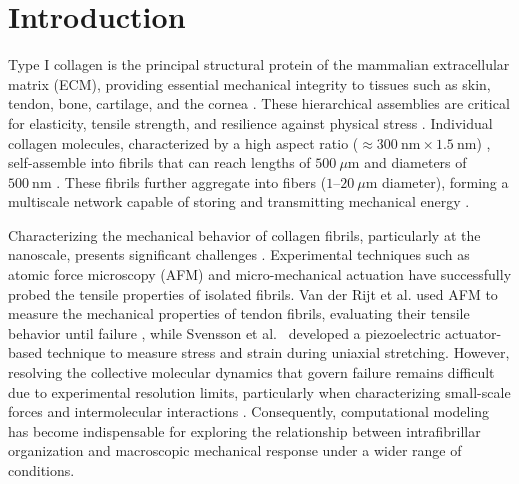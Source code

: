 \documentclass[aps,physrev,preprint,groupedaddress,linenumbers]{revtex4-2}
\begin{document}

\maketitle

\section{Introduction}

Type I collagen is the principal structural protein of the mammalian extracellular matrix (ECM), providing essential mechanical integrity to tissues such as skin, tendon, bone, cartilage, and the cornea \cite{Silver2018,DavisonKotler2019,Tresoldi2013,Fedarko2014, RicoLlanos2021,Chen2015,Suki2021}. These hierarchical assemblies are critical for elasticity, tensile strength, and resilience against physical stress \cite{Silver2018,Amirrah2022}. Individual collagen molecules, characterized by a high aspect ratio ($\approx 300~\text{nm} \times 1.5~\text{nm}$) \cite{Gelse2003, Silver2018}, self-assemble into fibrils that can reach lengths of $500~\mu\text{m}$ and diameters of $500~\text{nm}$ \cite{Charvolin2019,Kadler1996, Parry1984}. These fibrils further aggregate into fibers ($1$--$20~\mu\text{m}$ diameter), forming a multiscale network capable of storing and transmitting mechanical energy \cite{Silver2008,Suki2021}.

Characterizing the mechanical behavior of collagen fibrils, particularly at the nanoscale, presents significant challenges \cite{Nalbach2022}. Experimental techniques such as atomic force microscopy (AFM) and micro-mechanical actuation have successfully probed the tensile properties of isolated fibrils. Van der Rijt et al. used AFM to measure the mechanical properties of tendon fibrils, evaluating their tensile behavior until failure \cite{vanderRijt2006}, while Svensson et al.~\cite{Svensson2018} developed a piezoelectric actuator-based technique to measure stress and strain during uniaxial stretching. However, resolving the collective molecular dynamics that govern failure remains difficult due to experimental resolution limits, particularly when characterizing small-scale forces and intermolecular interactions \cite{Andriotis2023}. Consequently, computational modeling has become indispensable for exploring the relationship between intrafibrillar organization and macroscopic mechanical response under a wider range of conditions.
\end{document}
